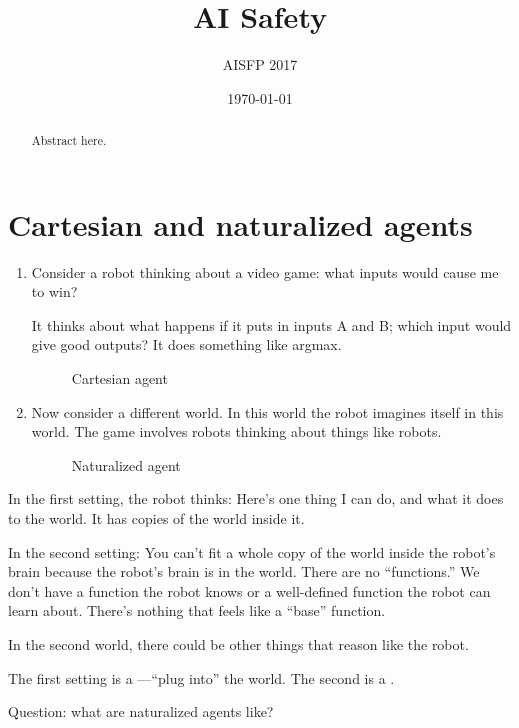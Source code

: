 \documentclass[11pt]{article}
\begin{document}
\title{AI Safety}

\author{AISFP 2017}

\date{\today}
\maketitle
\begin{abstract}
Abstract here.
\end{abstract}

\tableofcontents

\section{Cartesian and naturalized agents}

\begin{enumerate}
\item
Consider a robot thinking about a video game: what inputs would cause me to win?

It thinks about what happens if it puts in inputs A and B; which input would give good outputs? It does something like argmax. 

\begin{figure}
\caption{Cartesian agent}
\end{figure}
\item
Now consider a different world. In this world the robot imagines itself in this world. The game involves robots thinking about things like robots.

\begin{figure}
\caption{Naturalized agent}
\end{figure}
\end{enumerate}
In the first setting, the robot thinks: Here's one thing I can do, and what it does to the world. It has copies of the world inside it. 

In the second setting: You can't fit a whole copy of the world inside the robot's brain because the robot's brain is in the world. There are no ``functions.'' We don't have a function the robot knows or a well-defined function the robot can learn about. There's nothing that feels like a ``base'' function.

In the second world, there could be other things that reason like the robot.

The first setting is a ---``plug into'' the world. The second is a . 

Question: what are naturalized agents like?
\end{document}
